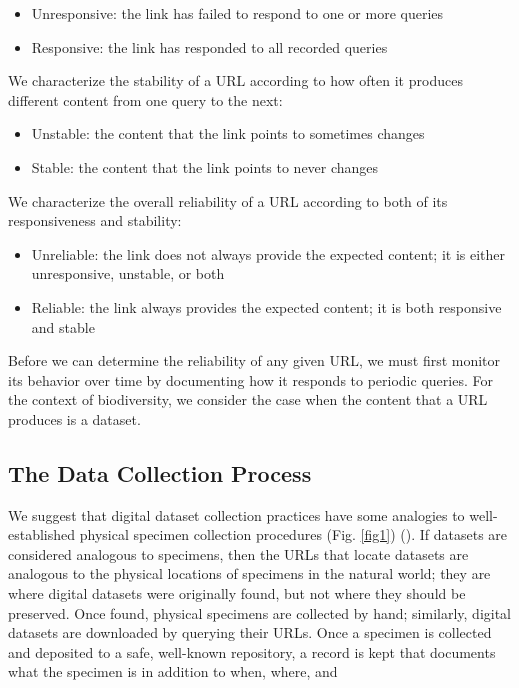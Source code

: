 \documentclass[10pt,letterpaper]{article}
\begin{document}
\begin{itemize}
    \item Unresponsive: the link has failed to respond to one or more queries
    \item Responsive: the link has responded to all recorded queries
\end{itemize}

We characterize the stability of a URL according to how often it produces different content from one query to the next:

\begin{itemize}
    \item Unstable: the content that the link points to sometimes changes
    \item Stable: the content that the link points to never changes
\end{itemize}

We characterize the overall reliability of a URL according to both of its responsiveness and stability:

\begin{itemize}
    \item Unreliable: the link does not always provide the expected content; it is either unresponsive, unstable, or both 
    \item Reliable: the link always provides the expected content; it is both responsive and stable
\end{itemize}

Before we can determine the reliability of any given URL, we must first monitor its behavior over time by documenting how it responds to periodic queries. For the context of biodiversity, we consider the case when the content that a URL produces is a dataset.

\subsection*{The Data Collection Process}

We suggest that digital dataset collection practices have some analogies to well-established physical specimen collection procedures (Fig. \ref{fig1}) (\cite{Poelen_2019}). If datasets are considered analogous to specimens, then the URLs that locate datasets are analogous to the physical locations of specimens in the natural world; they are where digital datasets were originally found, but not where they should be preserved. Once found, physical specimens are collected by hand; similarly, digital datasets are downloaded by querying their URLs. Once a specimen is collected and deposited to a safe, well-known repository, a record is kept that documents what the specimen is in addition to when, where, and 
\end{document}
